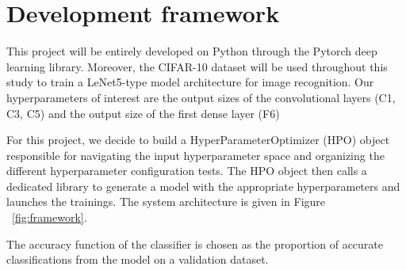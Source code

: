 \documentclass[a4 paper,11pt,2]{article}
\begin{document}
\section{Development framework}
This project will be entirely developed on Python through the Pytorch deep
learning library. Moreover, the CIFAR-10 dataset will be used throughout this
study to train a LeNet5-type model architecture for image recognition. Our
hyperparameters of interest are the output sizes of the convolutional layers
(C1, C3, C5) and the output size of the first dense layer (F6)

For this project, we decide to build a HyperParameterOptimizer (HPO) object
responsible for navigating the input hyperparameter space and organizing the
different hyperparameter configuration tests. The HPO object then calls a
dedicated library to generate a model with the appropriate hyperparameters and
launches the trainings. The system architecture is given in Figure
~\ref{fig:framework}.

The accuracy function of the classifier is chosen as the proportion of accurate
classifications from the model on a validation dataset.
\end{document}
